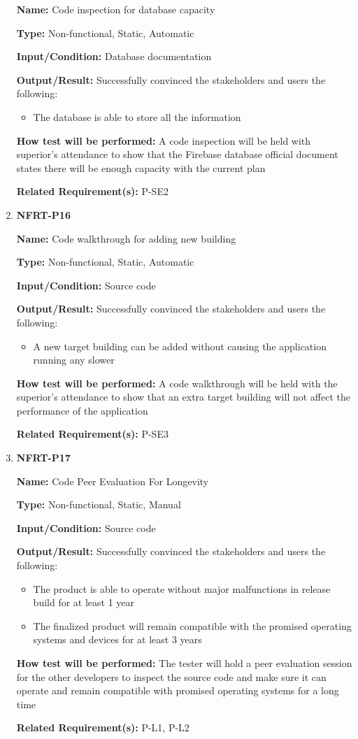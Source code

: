 \documentclass[12pt, titlepage]{article}
\begin{document}
\begin{enumerate}
\textbf{Name:} Code inspection for database capacity

\textbf{Type:} Non-functional, Static, Automatic

\textbf{Input/Condition:} Database documentation

\textbf{Output/Result:} Successfully convinced the stakeholders and users the following:
\begin{itemize}
\item The database is able to store all the information
\end{itemize}

\textbf{How test will be performed:} A code inspection will be held with superior's attendance to show that the Firebase database official document states there will be enough capacity with the current plan

\textbf{Related Requirement(s):} P-SE2

\item{\textbf{NFRT-P16}}

\textbf{Name:} Code walkthrough for adding new building

\textbf{Type:} Non-functional, Static, Automatic

\textbf{Input/Condition:} Source code

\textbf{Output/Result:} Successfully convinced the stakeholders and users the following:
\begin{itemize}
\item A new target building can be added without causing the application running any slower
\end{itemize}

\textbf{How test will be performed:} A code walkthrough will be held with the superior's attendance to show that an extra target building will not affect the performance of the application

\textbf{Related Requirement(s):} P-SE3

\item{\textbf{NFRT-P17}}

\textbf{Name:} Code Peer Evaluation For Longevity

\textbf{Type:} Non-functional, Static, Manual

\textbf{Input/Condition:} Source code

\textbf{Output/Result:} Successfully convinced the stakeholders and users the following:
\begin{itemize} 
  \item The product is able to operate without major malfunctions in release build for at least 1 year
  \item The finalized product will remain compatible with the promised operating systems and devices for at least 3 years
\end{itemize}

\textbf{How test will be performed:} The tester will hold a peer evaluation session for the other developers to inspect the source code and make sure it can operate and remain compatible with promised operating systems for a long time

\textbf{Related Requirement(s):} P-L1, P-L2
\end{enumerate}
\end{document}
